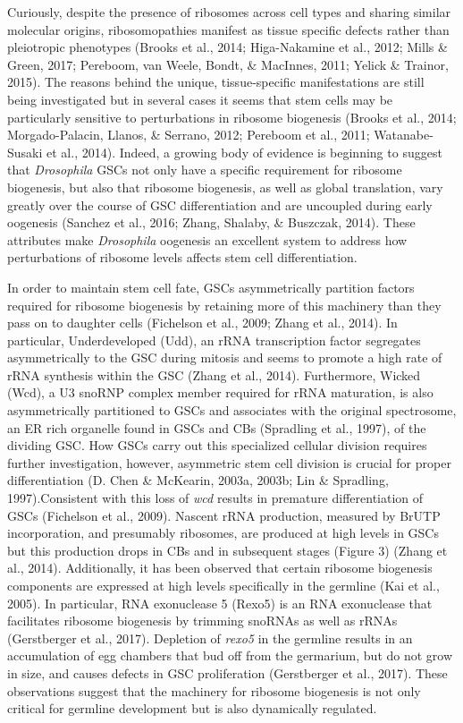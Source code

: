 \documentclass[12pt,oneside]{reedthesis}
\begin{document}
Curiously, despite the presence of ribosomes across cell types and
sharing similar molecular origins, ribosomopathies manifest as tissue
specific defects rather than pleiotropic phenotypes (Brooks et al., 2014; Higa-Nakamine et al., 2012; Mills \& Green, 2017; Pereboom, van Weele, Bondt, \& MacInnes, 2011; Yelick \& Trainor, 2015).
The reasons behind the unique, tissue-specific manifestations are still
being investigated but in several cases it seems that stem cells may be
particularly sensitive to perturbations in ribosome biogenesis
(Brooks et al., 2014; Morgado-Palacin, Llanos, \& Serrano, 2012; Pereboom et al., 2011; Watanabe-Susaki et al., 2014). Indeed, a growing body of evidence is beginning
to suggest that \emph{Drosophila} GSCs not only have a specific requirement
for ribosome biogenesis, but also that ribosome biogenesis, as well as
global translation, vary greatly over the course of GSC differentiation
and are uncoupled during early oogenesis (Sanchez et al., 2016; Zhang, Shalaby, \& Buszczak, 2014). These attributes make \emph{Drosophila} oogenesis an
excellent system to address how perturbations of ribosome levels affects
stem cell differentiation.

In order to maintain stem cell fate, GSCs asymmetrically partition
factors required for ribosome biogenesis by retaining more of this
machinery than they pass on to daughter cells (Fichelson et al., 2009; Zhang et al., 2014). In particular, Underdeveloped (Udd), an rRNA
transcription factor segregates asymmetrically to the GSC during mitosis
and seems to promote a high rate of rRNA synthesis within the GSC
(Zhang et al., 2014). Furthermore, Wicked (Wcd), a U3 snoRNP complex member
required for rRNA maturation, is also asymmetrically partitioned to GSCs
and associates with the original spectrosome, an ER rich organelle found
in GSCs and CBs (Spradling et al., 1997), of the dividing GSC. How GSCs
carry out this specialized cellular division requires further
investigation, however, asymmetric stem cell division is crucial for
proper differentiation (D. Chen \& McKearin, 2003a, 2003b; Lin \& Spradling, 1997).Consistent with this loss of \emph{wcd} results in premature
differentiation of GSCs (Fichelson et al., 2009). Nascent rRNA production,
measured by BrUTP incorporation, and presumably ribosomes, are produced
at high levels in GSCs but this production drops in CBs and in
subsequent stages (Figure 3) (Zhang et al., 2014). Additionally, it has been
observed that certain ribosome biogenesis components are expressed at
high levels specifically in the germline (Kai et al., 2005). In particular,
RNA exonuclease 5 (Rexo5) is an RNA exonuclease that facilitates
ribosome biogenesis by trimming snoRNAs as well as rRNAs
(Gerstberger et al., 2017). Depletion of \emph{rexo5} in the germline results in
an accumulation of egg chambers that bud off from the germarium, but do
not grow in size, and causes defects in GSC proliferation
(Gerstberger et al., 2017). These observations suggest that the machinery for
ribosome biogenesis is not only critical for germline development but is
also dynamically regulated.
\end{document}
